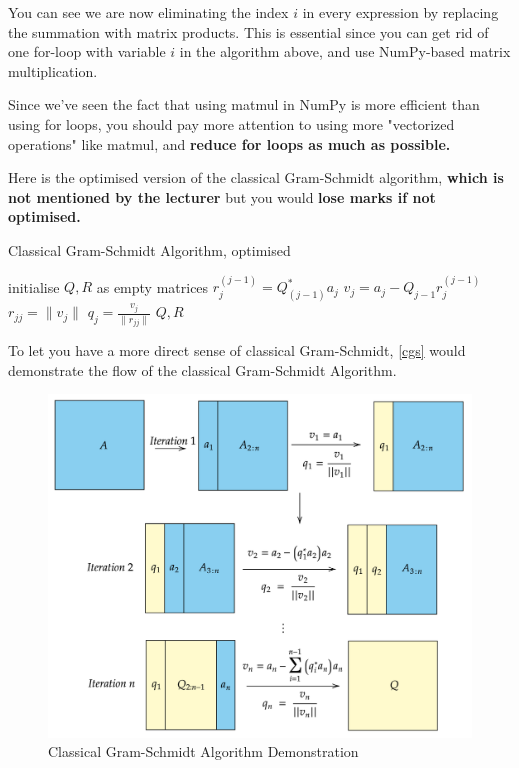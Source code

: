 \noindent 
You can see we are now eliminating the index \(i\) in every expression by replacing the summation with matrix products. This is essential since you can get rid of one for-loop with variable \(i\)  in the algorithm above, and use NumPy-based matrix multiplication. \smallskip

\noindent Since we've seen the fact that using matmul in NumPy is more efficient than using for loops, you should pay more attention to using more "vectorized operations" like matmul, and \textbf{reduce for loops as much as possible. }

\noindent Here is the optimised version of the classical Gram-Schmidt algorithm, \textbf{which is not mentioned by the lecturer} but you would \textbf{lose marks if not optimised.}
\begin{algorithm}
  \caption{Classical Gram-Schmidt Algorithm, optimised}
  \begin{algorithmic}[1]
    \State initialise \(Q, R\)  as empty matrices
      \State \(r_j^{(j - 1)} = Q_{(j - 1)}^{*}a_j\)
      \State \(v_j = a_j - Q_{j - 1}r_j^{(j - 1)}\)
      \State \(r_{jj} = \|v_j\|\)
      \State \(q_j = \frac{v_j}{\|r_{jj}\|}\)    
    \EndFor
    \State \Return \(Q, R\) 
  \EndProcedure
  \end{algorithmic}
\end{algorithm}

\newpage
\noindent To let you have a more direct sense of classical Gram-Schmidt, \autoref{cgs} would demonstrate the flow of the classical Gram-Schmidt Algorithm. 
\begin{figure}[htp]
  \centering
  \includegraphics[width=\textwidth]{imgs/cgs.png}
  \caption{Classical Gram-Schmidt Algorithm Demonstration}
  \label{cgs}
\end{figure}

